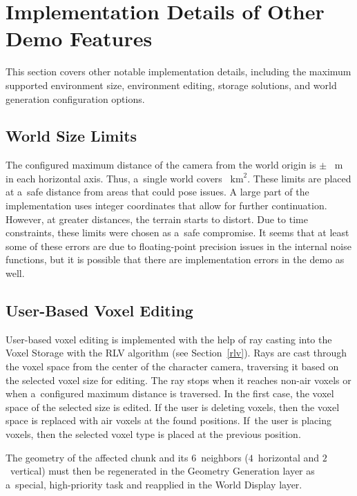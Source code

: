 \section{Implementation Details of Other Demo Features}

This section covers other notable implementation details, including the maximum supported environment size, environment editing, storage solutions, and world generation configuration options.

\subsection{World Size Limits}

The configured maximum distance of the camera from the world origin is $\pm$ ~m in each horizontal axis. Thus, a~single world covers ~$\text{km}^{\text{2}}$. These limits are placed at a~safe distance from areas that could pose issues. A large part of the implementation uses integer coordinates that allow for further continuation. However, at greater distances, the terrain starts to distort. Due to time constraints, these limits were chosen as a~safe compromise. It seems that at least some of these errors are due to floating-point precision issues in the internal noise functions, but it is possible that there are implementation errors in the demo as well.

\subsection{User-Based Voxel Editing}

User-based voxel editing is implemented with the help of ray casting into the Voxel Storage with the RLV algorithm (see Section~\ref{rlv}). Rays are cast through the voxel space from the center of the character camera, traversing it based on the selected voxel size for editing. The ray stops when it reaches non-air voxels or when a~configured maximum distance is traversed. In the first case, the voxel space of the selected size is edited. If the user is deleting voxels, then the voxel space is replaced with air voxels at the found positions. If~the user is placing voxels, then the selected voxel type is placed at the previous position.

The geometry of the affected chunk and its $6$~neighbors ($4$~horizontal and $2$~vertical) must then be regenerated in the Geometry Generation layer as a~special, high-priority task and reapplied in the World Display layer.


